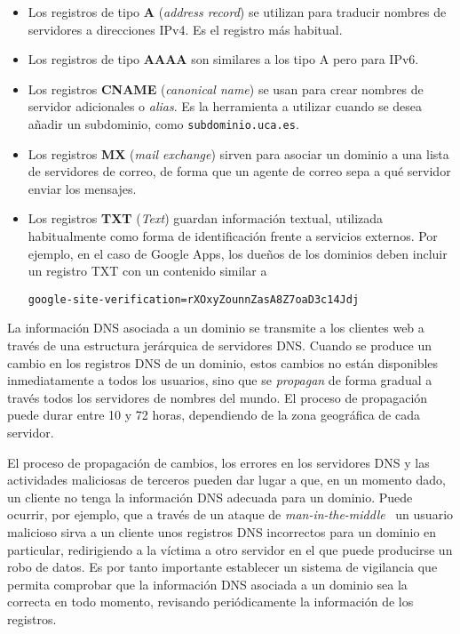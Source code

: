 \begin{itemize}
\item Los registros de tipo \textbf{A} (\textit{address record}) se utilizan
  para traducir nombres de servidores a direcciones IPv4. Es el registro más habitual.
\item Los registros de tipo \textbf{AAAA} son similares a los tipo A pero para IPv6.
\item Los registros \textbf{CNAME} (\textit{canonical name}) se usan para crear
  nombres de servidor adicionales o \textit{alias}. Es la herramienta a utilizar
  cuando se desea añadir un subdominio, como \texttt{subdominio.uca.es}.
\item Los registros \textbf{MX} (\textit{mail exchange}) sirven para asociar un
  dominio a una lista de servidores de correo, de forma que un agente de correo
  sepa a qué servidor enviar los mensajes.
\item Los registros \textbf{TXT} (\textit{Text}) guardan información textual,
  utilizada habitualmente como forma de identificación frente a servicios
  externos. Por ejemplo, en el caso de Google Apps, los dueños de los dominios
  deben incluir un registro TXT con un contenido similar a

\begin{verbatim}
google-site-verification=rXOxyZounnZasA8Z7oaD3c14Jdj
\end{verbatim}
\end{itemize}

La información DNS asociada a un dominio se transmite a los clientes web a
través de una estructura jerárquica de servidores DNS. Cuando se produce un
cambio en los registros DNS de un dominio, estos cambios no están disponibles
inmediatamente a todos los usuarios, sino que se \textit{propagan} de forma
gradual a través todos los servidores de nombres del mundo. El proceso de
propagación puede durar entre 10 y 72 horas, dependiendo de la zona geográfica
de cada servidor.

El proceso de propagación de cambios, los errores en los servidores DNS y las
actividades maliciosas de terceros pueden dar lugar a que, en un momento dado,
un cliente no tenga la información DNS adecuada para un dominio. Puede ocurrir,
por ejemplo, que a través de un ataque de
\textit{man-in-the-middle}~\cite{ataquemitm} un usuario malicioso sirva a un
cliente unos registros DNS incorrectos para un dominio en particular,
redirigiendo a la víctima a otro servidor en el que puede producirse un robo de
datos. Es por tanto importante establecer un sistema de vigilancia que permita
comprobar que la información DNS asociada a un dominio sea la correcta en todo
momento, revisando periódicamente la información de los registros.

